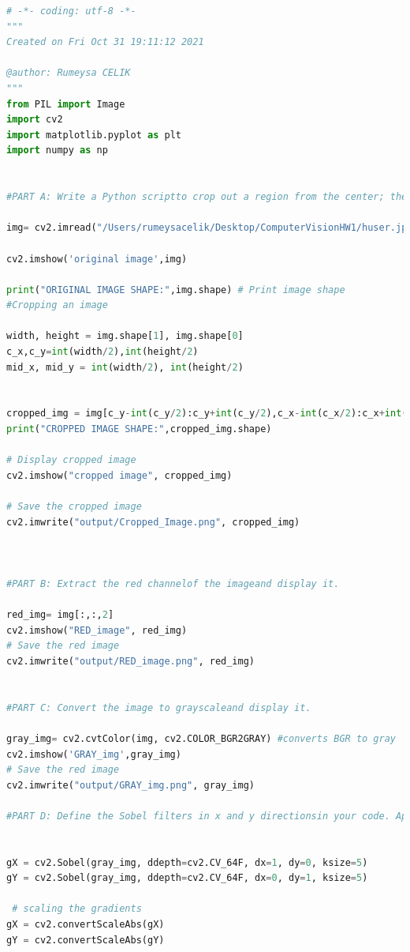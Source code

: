 \documentclass[a4paper, 12pt]{report}
\begin{document}
\lstset{style=mystyle}
\begin{lstlisting}[language=Python]
# -*- coding: utf-8 -*-
"""
Created on Fri Oct 31 19:11:12 2021

@author: Rumeysa CELIK
"""
from PIL import Image
import cv2
import matplotlib.pyplot as plt
import numpy as np


#PART A: Write a Python scriptto crop out a region from the center; the region size      should be half the size of the input image. Save the image as a pngfile.

img= cv2.imread("/Users/rumeysacelik/Desktop/ComputerVisionHW1/huser.jpeg",cv2.COLOR_BGR2GRAY)

cv2.imshow('original image',img)

print("ORIGINAL IMAGE SHAPE:",img.shape) # Print image shape
#Cropping an image

width, height = img.shape[1], img.shape[0]
c_x,c_y=int(width/2),int(height/2) 
mid_x, mid_y = int(width/2), int(height/2)


cropped_img = img[c_y-int(c_y/2):c_y+int(c_y/2),c_x-int(c_x/2):c_x+int(c_x/2)]
print("CROPPED IMAGE SHAPE:",cropped_img.shape)  

# Display cropped image
cv2.imshow("cropped image", cropped_img)

# Save the cropped image
cv2.imwrite("output/Cropped_Image.png", cropped_img)



#PART B: Extract the red channelof the imageand display it.

red_img= img[:,:,2]
cv2.imshow("RED_image", red_img)
# Save the red image
cv2.imwrite("output/RED_image.png", red_img)
 

#PART C: Convert the image to grayscaleand display it.

gray_img= cv2.cvtColor(img, cv2.COLOR_BGR2GRAY) #converts BGR to gray
cv2.imshow('GRAY_img',gray_img)
# Save the red image
cv2.imwrite("output/GRAY_img.png", gray_img)

#PART D: Define the Sobel filters in x and y directionsin your code. Apply thesefilters to the grayscale image and displaythe results.Using these gradients, obtain the gradient magnitude and gradient orientation. Find out a way to display the gradient orientation; display the gradient magnitude and gradient orientation.


gX = cv2.Sobel(gray_img, ddepth=cv2.CV_64F, dx=1, dy=0, ksize=5)
gY = cv2.Sobel(gray_img, ddepth=cv2.CV_64F, dx=0, dy=1, ksize=5)

 # scaling the gradients
gX = cv2.convertScaleAbs(gX)
gY = cv2.convertScaleAbs(gY)



\end{lstlisting}
\end{document}
